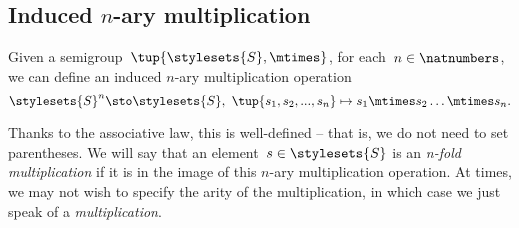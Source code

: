 \subsection{Induced $n$-ary multiplication}
Given a semigroup~$\tup{\stylesets{S}, \mtimes}$, for each~$n \in \natnumbers$, we can define an induced $n$-ary multiplication operation
\begin{equation*}
    \stylesets{S}^n \sto \stylesets{S}, \ \tup{s_1, s_2, ..., s_n} \mapsto s_1 \mtimes s_2 \dots \mtimes s_n.
\end{equation*}





Thanks to the associative law, this is well-defined -- that is, we do not need to set parentheses.
We will say that an element~$s \in \stylesets{S}$ is an \emph{n-fold multiplication} if it is in the image of this $n$-ary multiplication operation.
At times, we may not wish to specify the arity of the multiplication, in which case we just speak of a \emph{multiplication}.

\showslides{\begin{forslides}
                \begin{equation}
                    \label{eq:sg-mora}
                    \mora
                \end{equation}
                \begin{equation}
                    \label{eq:sg-morb}
                    \morb
                \end{equation}
                \begin{equation}
                    \label{eq:sg-morab}
                    \mora\then\morb
                \end{equation}

\end{forslides}
}
